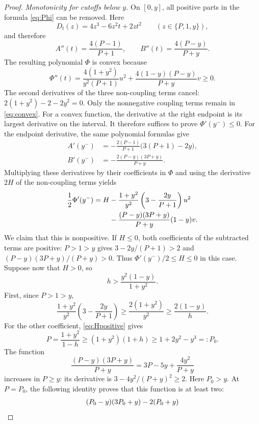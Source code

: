 \documentclass[11pt]{article}
\numberwithin{equation}{section}
\begin{document}
\begin{proof}
\smallskip
\noindent\emph{Monotonicity for cutoffs below $y$.}
On $[0,y]$, all positive parts in the formula \eqref{eq:Phi}
can be removed. Here
\[
 D_t(z)=4z^3-6z^2t+2zt^2\qquad(z\in\{P,1,y\}),
\]
and therefore
\[
 A''(t)=\frac{4(P-1)}{P+1},\qquad
 B''(t)=\frac{4(P-y)}{P+y}.
\]
The resulting polynomial $\Phi$ is convex because
\begin{equation}\label{eq:convex}
 \Phi''(t)=\frac{4(1+y^2)}{y^2(P+1)}u^2
 +\frac{4(1-y)(P-y)}{P+y}v\ge0.
\end{equation}
The second derivatives of the three non-coupling terms cancel:
$2(1+y^2)-2-2y^2=0$. Only the nonnegative coupling terms remain
in \eqref{eq:convex}. For a convex function, the derivative at the
right endpoint is its largest derivative on the interval. It
therefore suffices to prove $\Phi'(y^-)\le0$.
For the endpoint derivative, the same polynomial formulas give
\begin{align*}
 A'(y^-)&=-\frac{2(P-1)}{P+1}\bigl(3(P+1)-2y\bigr),\\
 B'(y^-)&=-\frac{2(P-y)(3P+y)}{P+y}.
\end{align*}
Multiplying these derivatives by their coefficients in $\Phi$
and using the derivative $2H$ of the non-coupling terms yields
\begin{align}\label{eq:derivative}
 \frac12\Phi'(y^-)=H
 &-\frac{1+y^2}{y^2}\left(3-\frac{2y}{P+1}\right)u^2\notag\\
 &-\frac{(P-y)(3P+y)}{P+y}(1-y)v.
\end{align}
We claim that this is nonpositive. If $H\le0$, both coefficients
of the subtracted terms are positive: $P>1>y$ gives
$3-2y/(P+1)>2$ and $(P-y)(3P+y)/(P+y)>0$.
Thus $\Phi'(y^-)/2\le H\le0$ in this case.
Suppose now that $H>0$, so
\begin{equation}\label{eq:Hpositive}
 h>\frac{y^2(1-y)}{1+y^2}.
\end{equation}
First, since $P>1>y$,
\begin{equation}\label{eq:firstcost}
 \frac{1+y^2}{y^2}\left(3-\frac{2y}{P+1}\right)
 \ge\frac{2(1+y^2)}{y^2}\ge\frac{2(1-y)}h.
\end{equation}
For the other coefficient, \eqref{eq:Hpositive} gives
\[
 P=\frac{1+y^2}{1-h}\ge(1+y^2)(1+h)
 \ge1+2y^2-y^3=:P_0.
\]
The function
\[
 \frac{(P-y)(3P+y)}{P+y}=3P-5y+\frac{4y^2}{P+y}
\]
increases in $P\ge y$: its derivative is $3-4y^2/(P+y)^2\ge2$. Here $P_0>y$. At $P=P_0$, the following identity proves that this function is at least two:
\begin{align}\label{eq:derivcert}
 &(P_0-y)(3P_0+y)-2(P_0+y)\notag\\

\end{align}
\end{proof}
\end{document}
